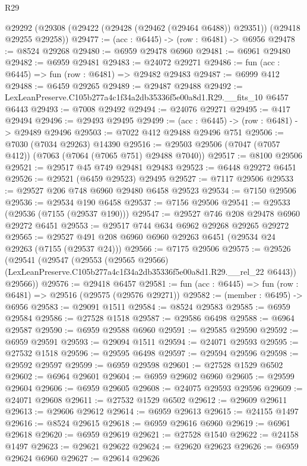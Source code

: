 \begin{lexlean}{R29}
\begin{coremodule}
  @29292 (@29308 (@29422 (@29428 (@29462 (@29464 @6488)) @29351)) (@29418 @29255 @29258))
@29477 := (acc : @6445) -> (row : @6481) -> @6956
@29478 := @8524 @29268
@29480 := @6959 @29478 @6960
@29481 := @6961 @29480
@29482 := @6959 @29481
@29483 := @24072 @29271
@29486 := fun (acc : @6445) => fun (row : @6481) => @29482 @29483
@29487 := @6999 @412
@29488 := @6459 @29265
@29489 := @29487 @29488
@29492 := LexLeanPreserve.C105b277a4c1f34a2db35336f5e00a8d1.R29.__fits_10 @6457 @6443
@29493 := @7008 @29492
@29494 := @24076 @29271
@29495 := @417 @29494
@29496 := @29493 @29495
@29499 := (acc : @6445) -> (row : @6481) -> @29489 @29496
@29503 := @7022 @412 @29488 @29496 @751
@29506 := @7030 (@7034 @29263) @14390
@29516 := @29503 @29506 (@7047 (@7057 @412)) (@7063 (@7064 (@7065 @751) @29488 @7040))
@29517 := @8100 @29506
@29521 := @29517 @45 @749 @29481 @29483
@29523 := @6448 @29272 @6451
@29526 := @29521 (@6459 @29523) @29495
@29527 := @7117 @29506
@29533 := @29527 @206 @748 @6960 @29480 @6458 @29523
@29534 := @7150 @29506
@29536 := @29534 @190 @6458
@29537 := @7156 @29506
@29541 := @29533 (@29536 (@7155 (@29537 @190)))
@29547 := @29527 @746 @208 @29478 @6960 @29272 @6451
@29553 := @29517 @744 @634 @6962 @29268 @29265 @29272
@29565 := @29527 @491 @208 @6960 @6960 @29263 @6451 (@29534 @24 @29263 (@7155 (@29537 @24)))
@29566 := @7175 @29506
@29575 := @29526
    (@29541
      (@29547
        (@29553
          (@29565 @29566)
          (LexLeanPreserve.C105b277a4c1f34a2db35336f5e00a8d1.R29.__rel_22 @6443))
        @29566))
@29576 := @29418 @6457
@29581 := fun (acc : @6445) => fun (row : @6481) => @29516 (@29575 (@29576 @29271))
@29582 := (member : @6495) -> @6956
@29583 := @29091 @1511
@29584 := @8524 @29583
@29585 := @6959 @29584
@29586 := @27528 @1518
@29587 := @29586 @6498
@29588 := @6964 @29587
@29590 := @6959 @29588 @6960
@29591 := @29585 @29590
@29592 := @6959 @29591
@29593 := @29094 @1511
@29594 := @24071 @29593
@29595 := @27532 @1518
@29596 := @29595 @6498
@29597 := @29594 @29596
@29598 := @29592 @29597
@29599 := @6959 @29598
@29601 := @27528 @1529 @6502
@29602 := @6964 @29601
@29604 := @6959 @29602 @6960
@29605 := @29599 @29604
@29606 := @6959 @29605
@29608 := @24075 @29593 @29596
@29609 := @24071 @29608
@29611 := @27532 @1529 @6502
@29612 := @29609 @29611
@29613 := @29606 @29612
@29614 := @6959 @29613
@29615 := @24155 @1497
@29616 := @8524 @29615
@29618 := @6959 @29616 @6960
@29619 := @6961 @29618
@29620 := @6959 @29619
@29621 := @27528 @1540
@29622 := @24158 @1497
@29623 := @29621 @29622
@29624 := @29620 @29623
@29626 := @6959 @29624 @6960
@29627 := @29614 @29626

\end{coremodule}
\end{lexlean}
